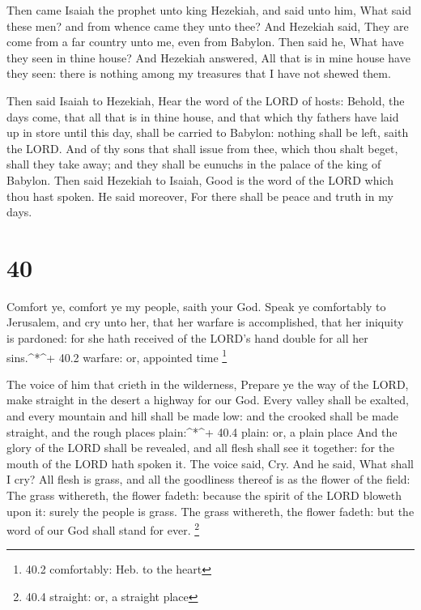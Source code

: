  Then came Isaiah the prophet unto king Hezekiah, and said
unto him, What said these men? and from whence came they unto thee? And
Hezekiah said, They are come from a far country unto me, even from
Babylon.  Then said he, What have they seen in thine house?
And Hezekiah answered, All that is in mine house have they seen: there
is nothing among my treasures that I have not shewed them.

 Then said Isaiah to Hezekiah, Hear the word of the LORD of
hosts:  Behold, the days come, that all that is in thine
house, and that which thy fathers have laid up in store until this day,
shall be carried to Babylon: nothing shall be left, saith the LORD.
 And of thy sons that shall issue from thee, which thou
shalt beget, shall they take away; and they shall be eunuchs in the
palace of the king of Babylon.  Then said Hezekiah to
Isaiah, Good is the word of the LORD which thou hast spoken. He said
moreover, For there shall be peace and truth in my days.

\hypertarget{section-39}{%
\section{40}\label{section-39}}

 Comfort ye, comfort ye my people, saith your God.
 Speak ye comfortably to Jerusalem, and cry unto her, that
her warfare is accomplished, that her iniquity is pardoned: for she hath
received of the LORD's hand double for all her sins.\^{}*\^{}+ 40.2
warfare: or, appointed time \footnote{40.2 comfortably: Heb. to the
  heart}

 The voice of him that crieth in the wilderness, Prepare ye
the way of the LORD, make straight in the desert a highway for our God.
 Every valley shall be exalted, and every mountain and hill
shall be made low: and the crooked shall be made straight, and the rough
places plain:\^{}*\^{}+ 40.4 plain: or, a plain place  And
the glory of the LORD shall be revealed, and all flesh shall see it
together: for the mouth of the LORD hath spoken it.  The
voice said, Cry. And he said, What shall I cry? All flesh is grass, and
all the goodliness thereof is as the flower of the field: 
The grass withereth, the flower fadeth: because the spirit of the LORD
bloweth upon it: surely the people is grass.  The grass
withereth, the flower fadeth: but the word of our God shall stand for
ever. \footnote{40.4 straight: or, a straight place}

